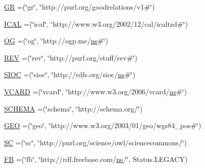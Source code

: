 \begin{DoxyCompactItemize}
\item 
\hyperlink{enumorg_1_1semanticweb_1_1owlapi_1_1vocab_1_1_namespaces_ad53b1fc321c75687635f15521e7031bd}{G\-R} =(\char`\"{}gr\char`\"{}, \char`\"{}http\-://purl.\-org/goodrelations/v1\#\char`\"{})
\item 
\hyperlink{enumorg_1_1semanticweb_1_1owlapi_1_1vocab_1_1_namespaces_aafcadb9bef2950634b7eb05cba4d4df3}{I\-C\-A\-L} =(\char`\"{}ical\char`\"{}, \char`\"{}http\-://www.\-w3.\-org/2002/12/cal/icaltzd\#\char`\"{})
\item 
\hyperlink{enumorg_1_1semanticweb_1_1owlapi_1_1vocab_1_1_namespaces_a5df618b6b0ec7922482cdd90491d1940}{O\-G} =(\char`\"{}og\char`\"{}, \char`\"{}http\-://ogp.\-me/\hyperlink{enumorg_1_1semanticweb_1_1owlapi_1_1vocab_1_1_namespaces_a88428054d2db7e7520b71b395aef20ac}{ns}\#\char`\"{})
\item 
\hyperlink{enumorg_1_1semanticweb_1_1owlapi_1_1vocab_1_1_namespaces_a1352667cd590e0b54c21a40d31cd9537}{R\-E\-V} =(\char`\"{}rev\char`\"{}, \char`\"{}http\-://purl.\-org/stuff/rev\#\char`\"{})
\item 
\hyperlink{enumorg_1_1semanticweb_1_1owlapi_1_1vocab_1_1_namespaces_aa14297fd57aab46fef51a602b1d92abe}{S\-I\-O\-C} =(\char`\"{}sioc\char`\"{}, \char`\"{}http\-://rdfs.\-org/sioc/\hyperlink{enumorg_1_1semanticweb_1_1owlapi_1_1vocab_1_1_namespaces_a88428054d2db7e7520b71b395aef20ac}{ns}\#\char`\"{})
\item 
\hyperlink{enumorg_1_1semanticweb_1_1owlapi_1_1vocab_1_1_namespaces_a0f941abbdb2c19ad2cd941f776fc4834}{V\-C\-A\-R\-D} =(\char`\"{}vcard\char`\"{}, \char`\"{}http\-://www.\-w3.\-org/2006/vcard/\hyperlink{enumorg_1_1semanticweb_1_1owlapi_1_1vocab_1_1_namespaces_a88428054d2db7e7520b71b395aef20ac}{ns}\#\char`\"{})
\item 
\hyperlink{enumorg_1_1semanticweb_1_1owlapi_1_1vocab_1_1_namespaces_a3a7848a1968a8f74226ad9b18bd509ea}{S\-C\-H\-E\-M\-A} =(\char`\"{}schema\char`\"{}, \char`\"{}http\-://schema.\-org/\char`\"{})
\item 
\hyperlink{enumorg_1_1semanticweb_1_1owlapi_1_1vocab_1_1_namespaces_a0332c5ce60a0fa40011d3ca833e5af57}{G\-E\-O} =(\char`\"{}geo\char`\"{}, \char`\"{}http\-://www.\-w3.\-org/2003/01/geo/wgs84\-\_\-pos\#\char`\"{})
\item 
\hyperlink{enumorg_1_1semanticweb_1_1owlapi_1_1vocab_1_1_namespaces_a46f8b8ebe04947918ee99fc31e5899dd}{S\-C} =(\char`\"{}sc\char`\"{}, \char`\"{}http\-://purl.\-org/science/owl/sciencecommons/\char`\"{})
\item 
\hyperlink{enumorg_1_1semanticweb_1_1owlapi_1_1vocab_1_1_namespaces_ad7cabf9dea17c9517f3fb363112d4ff3}{F\-B} =(\char`\"{}fb\char`\"{}, \char`\"{}http\-://rdf.\-freebase.\-com/\hyperlink{enumorg_1_1semanticweb_1_1owlapi_1_1vocab_1_1_namespaces_a88428054d2db7e7520b71b395aef20ac}{ns}/\char`\"{}, Status.\-L\-E\-G\-A\-C\-Y)

\end{DoxyCompactItemize}
